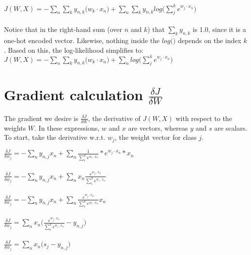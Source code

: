 \documentclass{article}
\begin{document}
$ \boxed{ J(W,X) = - \sum_{n} \sum_{k} y_{n,k}\big(w_{k} \cdot x_{n}\big) + \sum_{n} \sum_{k} y_{n,k} log\big(\sum_{j}^{k} e^{w_{j} \cdot x_{n}}\big) }$ \\ \\

Notice that in the right-hand sum (over $n$ and $k$) that $\sum_{k} y_{n,k}$ is 1.0, since it is a one-hot encoded vector. Likewise, nothing inside the $log(\dot)$ depends on the index $k$. Based on this, the log-likelihood simplifies to: \\

$ \boxed{ J(W,X) = - \sum_{n} \sum_{k} y_{n,k}\big(w_{k} \cdot x_{n}\big) + \sum_{n} log\big(\sum_{j}^{k} e^{w_{j} \cdot x_{n}}\big) }$ \\


\section{Gradient calculation $\frac{\delta J}{\delta W}$}

The gradient we desire is $\frac{\delta J}{\delta W}$, the derivative of $J(W,X)$ with respect to the weights $W$.
In these expressions, $w$ and $x$ are vectors, whereas $y$ and $s$ are scalars. To start, take the derivative w.r.t. $w_j$, the weight vector for class $j$.

$\frac{\delta J}{\delta w_{j}} = - \sum_{n} y_{n,j} x_{n} + \sum_{n} \frac{1}{\sum_{i}^{k} e^{w_{i} \cdot x_{n}}} * e^{w_j \cdot x_{n}} * x_{n}  $ \\ \\

$\frac{\delta J}{\delta w_{j}} = - \sum_{n} y_{n,j} x_{n} + \sum_{n} x_{n} \frac{e^{w_j \cdot x_{n}}} {\sum_{i}^{k} e^{w_{i} \cdot x_{n}}}  $ \\ \\

$\frac{\delta J}{\delta w_{j}} = - \sum_{n} y_{n,j} x_{n} + \sum_{n} \frac{e^{w_j \cdot x_{n}}} {\sum_{i}^{k} e^{w_{i} \cdot x_{n}}} x_{n} $ \\ \\


$\frac{\delta J}{\delta w_{j}} = \sum_{n} x_{n} \big(\frac{e^{w_j \cdot x_{n}}} {\sum_{i}^{k} e^{w_{i} \cdot x_{n}}} - y_{n,j}\big) $ \\ \\

$\frac{\delta J}{\delta w_{j}} = \sum_{n} x_{n} \big(s_{j} - y_{n,j}\big) $ \\ \\
\end{document}

